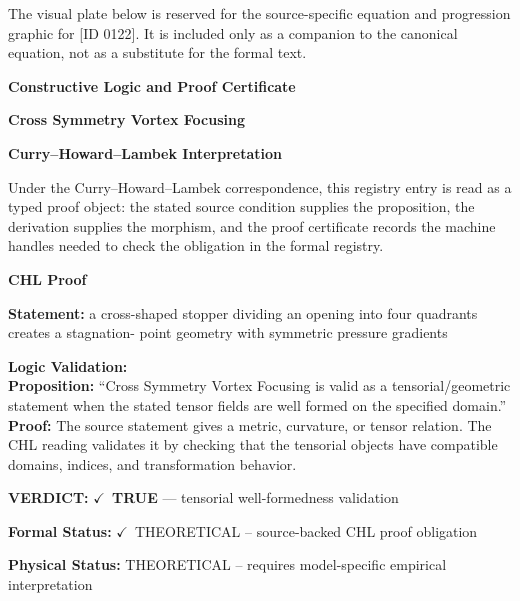 \begingroup\footnotesize\sloppy
The visual plate below is reserved for the source-specific equation and progression graphic for [ID 0122]. It is included only as a companion to the canonical equation, not as a substitute for the formal text.
\par\endgroup
\ifTZPDarkEdition
{}
\fi

\clearpage
\begingroup\tzpsupportsetup
\noindent\textbf{\fontsize{10.8pt}{12.8pt}\selectfont [ID 0122] Constructive Logic and Proof Certificate}\par
\noindent\textbf{\fontsize{10pt}{12pt}\selectfont Cross Symmetry Vortex Focusing}\par
\vspace{0.45em}
\begingroup
\footnotesize
\setlength{\parskip}{0.22em}
\setlength{\parindent}{0pt}
\noindent\textbf{Curry--Howard--Lambek Interpretation}\par
Under the Curry--Howard--Lambek correspondence, this registry entry is read as a typed proof
object: the stated source condition supplies the proposition, the derivation supplies the
morphism, and the proof certificate records the machine handles needed to check the obligation
in the formal registry.

\vspace{0.45em}
\noindent\textbf{CHL Proof}\par
\textbf{Statement:} a cross-shaped stopper dividing an opening into four quadrants creates a stagnation-
point geometry with symmetric pressure gradients

\textbf{Logic Validation:}\\
\textbf{Proposition:} ``Cross Symmetry Vortex Focusing is valid as a tensorial/geometric statement when the
stated tensor fields are well formed on the specified domain.''\\
\textbf{Proof:} The source statement gives a metric, curvature, or tensor relation. The CHL reading
validates it by checking that the tensorial objects have compatible domains, indices,
and transformation behavior.

\textbf{VERDICT:} \ensuremath{\checkmark}\ \textbf{TRUE} --- tensorial well-formedness validation

\textbf{Formal Status:} \ensuremath{\checkmark}\ THEORETICAL -- source-backed CHL proof obligation

\textbf{Physical Status:} THEORETICAL -- requires model-specific empirical interpretation
\par\vspace{0.45em}
\par
\ifTZPDarkEdition
{}
\fi
\endgroup
\endgroup
